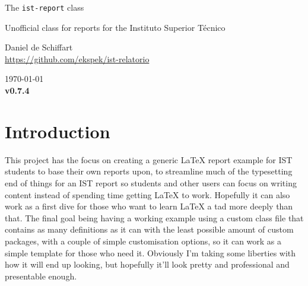\documentclass[palatino,english]{ist-report}
\begin{document}
\setinstitution{}
\settitle{}

\begin{center}
	\vspace*{1cm}
	{\huge The \texttt{ist-report} class}
	\medskip\par
	{\Large Unofficial class for reports for the Instituto Superior Técnico}
	\bigskip\bigskip\par
	{\large Daniel de Schiffart} \\
	{\url{https://github.com/ekspek/ist-relatorio}}
	\bigskip\smallskip\par
	\today \\
	\textbf{v0.7.4}
\end{center}
\vspace*{1cm}

\begin{abstract}
	This \LaTeX{} class was developed as an unofficial template for reports developed for the Instituto Superior Técnico of Universidade de Lisboa, themed around the style the university has developed for its own internal documentation, complemented by using specifications defined by the university itself, all the while taking some creative liberties with the missing definitions.

	This document details the class file, what it exactly contains, what its options are, and a concise documentation of its development, which will grow as the class file progresses. The class file itself, \texttt{ist-report.cls}, should be in the same directory as the \texttt{doc.tex} file.
\end{abstract}

\tableofcontents

\section{Introduction}

This project has the focus on creating a generic \LaTeX{} report example for IST students to base their own reports upon, to streamline much of the typesetting end of things for an IST report so students and other users can focus on writing content instead of spending time getting \LaTeX{} to work. Hopefully it can also work as a first dive for those who want to learn \LaTeX{} a tad more deeply than that. The final goal being having a working example using a custom class file that contains as many definitions as it can with the least possible amount of custom packages, with a couple of simple customisation options, so it can work as a simple template for those who need it. Obviously I'm taking some liberties with how it will end up looking, but hopefully it'll look pretty and professional and presentable enough.
\end{document}
